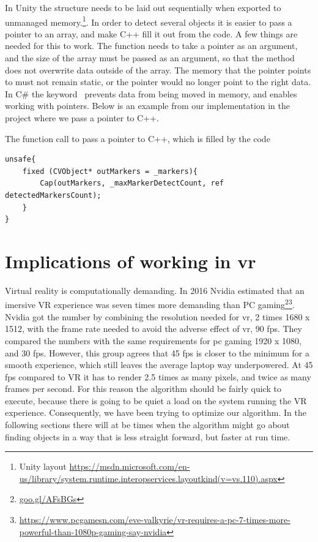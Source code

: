 In Unity the structure needs to be laid out sequentially when exported to unmanaged memory.\footnote{Unity layout \url{https://msdn.microsoft.com/en-us/library/system.runtime.interopservices.layoutkind(v=vs.110).aspx}}. In order to detect several objects it is easier to pass a pointer to an array, and make C++ fill it out from the code. A few things are needed for this to work. The function needs to take a pointer as an argument, and the size of the array must be passed as an argument, so that the method does not overwrite data outside of the array. The memory that the pointer points to must not remain static, or the pointer would no longer point to the right data. In C\# the keyword  prevents data from being moved in memory, and  enables working with pointers. Below is an example from our implementation in the project where we pass a pointer to C++. %
\begin{listing}[H]
\caption{The function call to pass a pointer to C++, which is filled by the code}
\label{listing:pointer}
\begin{verbatim}
unsafe{
	fixed (CVObject* outMarkers = _markers){
		Cap(outMarkers, _maxMarkerDetectCount, ref detectedMarkersCount);
	}
}
\end{verbatim}
\end{listing}
\section{Implications of working in vr}
Virtual reality is computationally demanding. In 2016 Nvidia estimated that an imersive VR experience was seven times more demanding than PC gaming\footnote{\url{goo.gl/AFsBGs}}\footnote{\url{https://www.pcgamesn.com/eve-valkyrie/vr-requires-a-pc-7-times-more-powerful-than-1080p-gaming-say-nvidia}}. Nvidia got the number by combining the resolution needed for vr, 2 times 1680 x 1512, with the frame rate needed to avoid the adverse effect of vr, 90 fps. They compared the numbers with the same requirements for pc gaming 1920 x 1080, and 30 fps. However, this group agrees that 45 fps is closer to the minimum for a smooth experience, which still leaves the average laptop way underpowered. At 45 fps compared to VR it has to render 2.5 times as many pixels, and twice as many frames per second.
For this reason the algorithm should be fairly quick to execute, because there is going to be quiet a load on the system running the VR experience. Consequently, we have been trying to optimize our algorithm. In the following sections there will at be times when the algorithm might go about finding objects in a way that is less straight forward, but faster at run time.

